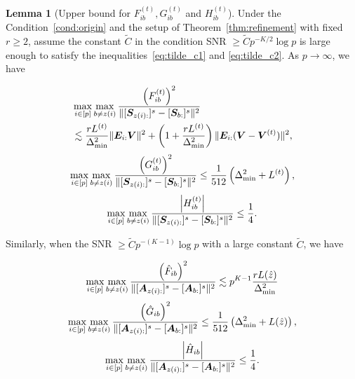 \documentclass[journal]{IEEEtran}
\theoremstyle{definition}
\newtheorem{lem}{Lemma}
\theoremstyle{definition}
\newcommand{\of}[1]{\left(#1\right)}
\newcommand{\aabs}[1]{\left|#1\right|}
\begin{document}
\begin{lem}[Upper bound for $F_{ib}^{(t)}, G_{ib}^{(t)}$ and $H_{ib}^{(t)}$]\label{lem:upper_fgh} Under the Condition~\ref{cond:origin} and the setup of Theorem~\ref{thm:refinement}  {with fixed $r \geq 2$},  assume the constant $\tilde C$ in the condition SNR $\geq \tilde C p^{-K/2} \log p$ is large enough to satisfy the inequalities~\eqref{eq:tilde_c1} and \eqref{eq:tilde_c2}. {As $p \rightarrow \infty$}, we have 

\vspace{-0.5cm}
\small
\begin{align}
    &\max_{i \in [p]} \max_{b \neq z(i)} \frac{\of{F_{ib}^{(t)}}^2}{ \onormSize{}{ [  \mS_{z(i):} ]^s  -  [ \mS_{b:} ]^s }^2 } \\
    &\lesssim  \frac{r L^{(t)}}{ \Delta_{\min}^2} \onormSize{}{\mE_{i:} \mV}^2 + \of{1 +  \frac{ r L^{(t)}}{ \Delta_{\min}^2}} \onormSize{}{\mE_{i:} (\mV - \mV^{(t)})}^2 ,\label{eq:fib}
\end{align}
    \begin{equation}\label{eq:gib}
        \max_{i \in [p]} \max_{b \neq z(i)} \frac{ \of{  G_{ib}^{(t)} }^2  }{ \onormSize{}{ [\mS_{z(i):} ]^s - [\mS_{b:}]^s }^2}  \leq  \frac{1}{512} \of{ \Delta_{\min}^2 +L^{(t)}},
    \end{equation}
    \begin{equation}\label{eq:hib}
        \max_{i \in [p]} \max_{b \neq z(i)}  \frac{ \aabs{  H_{ib}^{(t)} }  }{ \onormSize{}{ [\mS_{z(i):} ]^s - [\mS_{b:}]^s }^2} \leq \frac{1}{4}.
    \end{equation}
    \normalsize
    
    Similarly, when the SNR $\geq \tilde C p^{-(K-1)}\log p$ with a large constant $\tilde C$, we have 

    \vspace{-0.5cm}
    \small
     \begin{equation}\label{eq:fib_cor}
        \max_{i \in [p]} \max_{b \neq z(i)} \frac{\of{\hat F_{ib}}^2}{ \onormSize{}{ [  \mA_{z(i):} ]^s  -  [ \mA_{b:} ]^s }^2 } \lesssim p^{K-1} \frac{r L(\hat z)}{ \Delta_{\min}^2}
    \end{equation}
    \begin{equation}\label{eq:gib_cor}
        \max_{i \in [p]} \max_{b \neq z(i)} \frac{ \of{  \hat G_{ib} }^2  }{ \onormSize{}{ [\mA_{z(i):} ]^s - [\mA_{b:}]^s }^2}  \leq  \frac{1}{512} \of{ \Delta_{\min}^2 +L(\hat z)},
    \end{equation}
    \begin{equation}\label{eq:hib_cor}
        \max_{i \in [p]} \max_{b \neq z(i)}  \frac{ \aabs{  \hat H_{ib} }  }{ \onormSize{}{ [\mA_{z(i):} ]^s - [\mA_{b:}]^s }^2} \leq \frac{1}{4}.
    \end{equation}
    \end{lem}
    \normalsize
\end{document}
